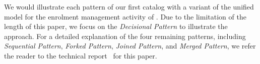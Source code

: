 {We would illustrate each pattern of our first catalog with a variant of the unified model for the enrolment management activity of \courseman. Due to the limitation of the length of this paper, we focus on the \textit{Decisional Pattern} to illustrate the approach. For a detailed explanation of the four remaining patterns, including \textit{Sequential Pattern}, \textit{Forked Pattern}, \textit{Joined Pattern}, and \textit{Merged Pattern}, we refer the reader to the technical report~\cite{dang2023aglTechReport} for this paper. 



}
